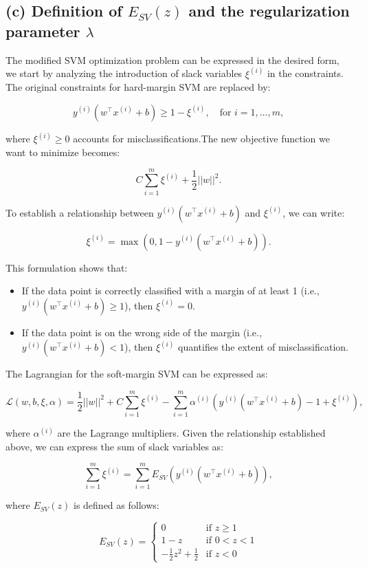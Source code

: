 \documentclass[12pt]{article}
\begin{document}
\subsection*{(c) Definition of \(E_{SV}(z)\) and the regularization parameter $\lambda$}

The modified SVM optimization problem can be expressed in the desired form, we start by analyzing the introduction of slack variables \(\xi^{(i)}\) in the constraints. The original constraints for hard-margin SVM are replaced by:

\[
y^{(i)}(w^\top x^{(i)} + b) \geq 1 - \xi^{(i)}, \quad \text{for } i = 1, \ldots, m,
\]

where \(\xi^{(i)} \geq 0\) accounts for misclassifications.The new objective function we want to minimize becomes:

\[
C \sum_{i=1}^{m} \xi^{(i)} + \frac{1}{2} ||w||^2.
\]

To establish a relationship between \(y^{(i)}(w^\top x^{(i)} + b)\) and \(\xi^{(i)}\), we can write:

\[
\xi^{(i)} = \max(0, 1 - y^{(i)}(w^\top x^{(i)} + b)).
\]

This formulation shows that:
\begin{itemize}
    \item If the data point is correctly classified with a margin of at least 1 (i.e., \(y^{(i)}(w^\top x^{(i)} + b) \geq 1\)), then \(\xi^{(i)} = 0\).
    \item If the data point is on the wrong side of the margin (i.e., \(y^{(i)}(w^\top x^{(i)} + b) < 1\)), then \(\xi^{(i)}\) quantifies the extent of misclassification.
\end{itemize}

The Lagrangian for the soft-margin SVM can be expressed as:

\[
\mathcal{L}(w, b, \xi, \alpha) = \frac{1}{2} ||w||^2 + C \sum_{i=1}^{m} \xi^{(i)} - \sum_{i=1}^{m} \alpha^{(i)} \left( y^{(i)}(w^\top x^{(i)} + b) - 1 + \xi^{(i)} \right),
\]

where \(\alpha^{(i)}\) are the Lagrange multipliers. Given the relationship established above, we can express the sum of slack variables as:

\[
\sum_{i=1}^{m} \xi^{(i)} = \sum_{i=1}^{m} E_{SV}(y^{(i)}(w^\top x^{(i)} + b)),
\]

where \(E_{SV}(z)\) is defined as follows:

\[
E_{SV}(z) = 
\begin{cases} 
0 & \text{if } z \geq 1 \\ 
1 - z & \text{if } 0 < z < 1 \\ 
-\frac{1}{2} z^2 + \frac{1}{2} & \text{if } z < 0 
\end{cases}
\]
\end{document}
